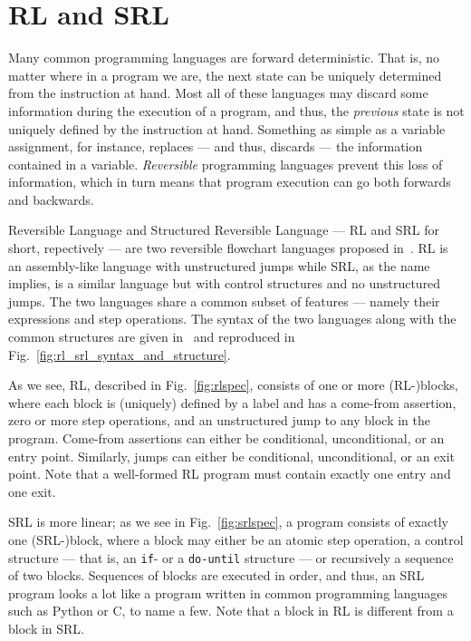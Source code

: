 
\section{RL and SRL}\label{sec:rlandsrl}

Many common programming languages are forward deterministic. That is, no matter where in a program we are, the next state can be uniquely determined from the instruction at hand. Most all of these languages may discard some information during the execution of a program, and thus, the \textit{previous} state is not uniquely defined by the instruction at hand. Something as simple as a variable assignment, for instance, replaces --- and thus, discards --- the information contained in a variable. \textit{Reversible} programming languages prevent this loss of information, which in turn means that program execution can go both forwards and backwards.

Reversible Language and Structured Reversible Language --- RL and SRL for short, repectively --- are two reversible flowchart languages proposed in~\cite{REV}. RL is an assembly-like language with unstructured jumps while SRL, as the name implies, is a similar language but with control structures and no unstructured jumps. The two languages share a common subset of features --- namely their expressions and step operations. The syntax of the two languages along with the common structures are given in~\cite[Fig.~12]{REV} and reproduced in Fig.~\ref{fig:rl_srl_syntax_and_structure}.

As we see, RL, described in Fig.~\ref{fig:rlspec}, consists of one or more (RL-)blocks, where each block is (uniquely) defined by a label and has a come-from assertion, zero or more step operations, and an unstructured jump to any block in the program. Come-from assertions can either be conditional, unconditional, or an entry point. Similarly, jumps can either be conditional, unconditional, or an exit point. Note that a well-formed RL program must contain exactly one entry and one exit.

SRL is more linear; as we see in Fig.~\ref{fig:srlspec}, a program consists of exactly one \mbox{(SRL-)block}, where a block may either be an atomic step operation, a control structure --- that is, an \texttt{if}- or a \texttt{do-until} structure --- or recursively a sequence of two blocks. Sequences of blocks are executed in order, and thus, an SRL program looks a lot like a program written in common programming languages such as Python or C, to name a few. Note that a block in RL is different from a block in SRL.


